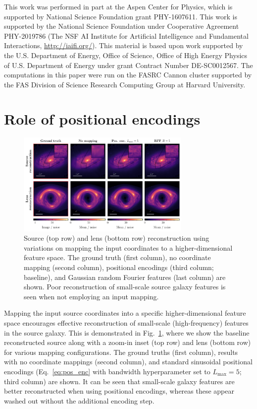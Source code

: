 \documentclass[nohyperref]{article}
\theoremstyle{plain}
\theoremstyle{definition}
\theoremstyle{remark}
\begin{document}
This work was performed in part at the Aspen Center for Physics, which is supported by National Science Foundation grant PHY-1607611.
This work is supported by the National Science Foundation under Cooperative Agreement PHY-2019786 (The NSF AI Institute for Artificial Intelligence and Fundamental Interactions, \url{http://iaifi.org/}).
This material is based upon work supported by the U.S. Department of Energy, Office of Science, Office of High Energy Physics of U.S. Department of Energy under grant Contract Number DE-SC0012567.
The computations in this paper were run on the FASRC Cannon cluster supported by the FAS Division of Science Research Computing Group at Harvard University.




\newpage
\appendix
\onecolumn

\section{Role of positional encodings}
\label{app:pos_enc}

\begin{figure}[!ht]
\centering
\includegraphics[width=0.75\textwidth]{figures/variations.pdf}
\vspace{-1em}
\caption{Source (top row) and lens (bottom row) reconstruction using variations on mapping the input coordinates to a higher-dimensional feature space. The ground truth (first column), no coordinate mapping (second column), positional encodings (third column; baseline), and Gaussian random Fourier features (last column) are shown. Poor reconstruction of small-scale source galaxy features is seen when not employing an input mapping.}
\label{fig:encodings}
\vspace{-0.5em}
\end{figure}

Mapping the input source coordinates into a specific higher-dimensional feature space encourages effective reconstruction of small-scale (high-frequency) features in the source galaxy. This is demonstrated in Fig.~\ref{fig:encodings}, where we show the baseline reconstructed source along with a zoom-in inset (top row) and lens (bottom row) for various mapping configurations. The ground truths (first column), results with no coordinate mappings (second column), and standard sinusoidal positional encodings (Eq.~\eqref{eq:pos_enc} with bandwidth hyperparameter set to $L_\mathrm{max} = 5$; third column) are shown. It can be seen that small-scale galaxy features are better reconstructed when using positional encodings, whereas these appear washed out without the additional encoding step.
\end{document}
